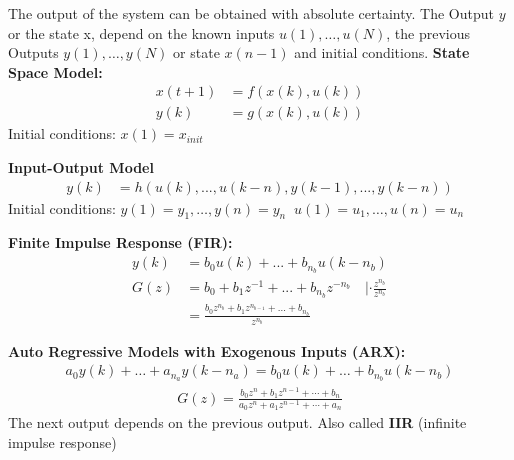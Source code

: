 \begin{tcolorbox}[colback=green!5!white,colframe=green!75!black,title=\textbf{Deterministic Model}]
	The output of the system can be obtained with absolute certainty. The Output $y$ or the state x, depend on the known inputs $u(1), \dots, u(N)$, the previous Outputs $y(1), \dots, y(N)$ or state $x(n-1)$ and initial conditions.  
\textbf{State Space Model: }
\begin{align*}
	 x(t+1) &= f(x(k), u(k)) \\
	y(k) &= g(x(k), u(k)) 
\end{align*}
Initial conditions: $x(1) = x_{init}$

\textbf{Input-Output Model}
\begin{align*}
y(k) &= h(u(k), ..., u(k-n), y(k-1), ..., y(k-n))
\end{align*}
Initial conditions: $y(1) = y_1,\dots,y(n) = y_n  \;\; u(1)= u_1,\dots,u(n) = u_n$

\textbf{Finite Impulse Response (FIR): } 
\begin{align*}
	y(k) &= b_0 u(k) + ... + b_{n_b} u(k-n_b) \\
	G(z) &= b_0 + b_1z^{-1} + ... + b_{n_b}z^{-n_b} \quad | \cdot \frac{z^{n_b}}{z^{n_b}} \\
	&= \frac{b_0 z^{n_b} + b_1 z^{ n_{b-1} } + ... + b_{n_b} }{z^{n_b}}
\end{align*}

\textbf{Auto Regressive Models with Exogenous Inputs (ARX): }
\begin{align*}
	a_0y(k)+\dots+a_{n_a}y(k-n_a) = b_0u(k) + \dots+b_{n_b}u(k-n_b)
\end{align*}
\begin{align*}
G(z) = \frac{b_0z^n + b_1z^{n-1} + \cdots + b_n}{a_0z^n + a_1z^{n-1} + \cdots + a_n}
\end{align*}
The next output depends on the previous output. Also called \textbf{IIR} (infinite impulse response)

\end{tcolorbox}		

